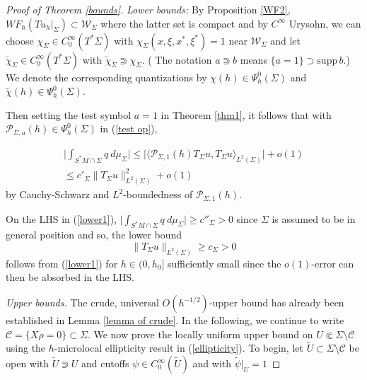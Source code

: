 \documentclass[11pt,reqno]{amsart}
\theoremstyle{definition}
\def\supp{\mathrm{supp}\,}
\begin{document}
\begin{proof}[Proof of Theorem \ref{bounds}]


    
 {\em Lower bounds:}   By Proposition \ref{WF2}, $WF_h(Tu_h|_{\Sigma}) \subset {\mathcal W}_{\Sigma}$ where the latter set is compact and by $C^{\infty}$ Urysohn,  we can choose $\chi_{\Sigma} \in C_0^{\infty}(T^*\Sigma)$ with $\chi_{\Sigma}(x,\xi,x^*,\xi^*)=1$  near ${\mathcal W}_{\Sigma}$ and let $\tilde{\chi}_{\Sigma} \in C^{\infty}_0(T^*\Sigma)$ with $\tilde{\chi}_{\Sigma} \Supset \chi_{\Sigma}.$ ( The notation $a\Supset b$ means $\{a=1\}\supset \supp b$.) We denote the corresponding quantizations by $\chi(h) \in \Psi_h^{0}(\Sigma)$ and $\tilde{\chi}(h) \in \Psi_h^0(\Sigma).$
    
    

    Then setting the test symbol $a =1$ in Theorem \ref{thm1}, it follows that with ${\mathcal P}_{\Sigma, a}(h) \in \Psi_h^0(\Sigma)$ in (\ref{test op}),
    
 \begin{eqnarray} \label{lower1}
\big| \int_{S^*M \cap \Sigma}q~ d\mu_{\Sigma} \big| \leq  \big|  \langle {\mathcal P}_{\Sigma,1}(h) T_{\Sigma} u, T_{\Sigma} u \rangle_{L^2(\Sigma)}  \big| + o(1) \nonumber \\
\leq c'_{\Sigma}   \| T_{\Sigma} u  \|^2_{L^2(\Sigma)} + o(1) 
\end{eqnarray}
by Cauchy-Schwarz and $L^2$-boundedness of ${\mathcal P}_{\Sigma,1}(h).$ 

On the LHS in (\ref{lower1}), $ \big| \int_{S^*M \cap \Sigma} q~d\mu_{\Sigma} \big|  \geq c''_{\Sigma} >0$ since $\Sigma$ is assumed to be in general position and so, the lower bound
$$ \| T_{\Sigma} u  \|_{L^2(\Sigma)}  \geq c_{\Sigma} >0$$
follows from (\ref{lower1})  for $h\in (0,h_0]$ sufficiently small since the $o(1)$-error can then be absorbed in the LHS. 

 

{\em Upper bounds.}
The crude, universal $O(h^{-1/2})$-upper bound has already been established in Lemma \ref{lemma of crude}. In the following, we continue to write ${\mathcal C} = \{ X \rho =0 \} \subset \Sigma.$ We now prove the  locally uniform upper bound on $U\Subset\Sigma\setminus {\mathcal C}$ using the $h$-microlocal ellipticity result in (\ref{ellipticity}). To begin, let $\tilde{U} \subset \Sigma \setminus {\mathcal C}$ be open with $\tilde{U} \Supset U$ and cutoffs $\psi \in C^{\infty}_0(\tilde{U})$ and with $\tilde{\psi} |_{U} =1$ 


\end{proof}
\end{document}
